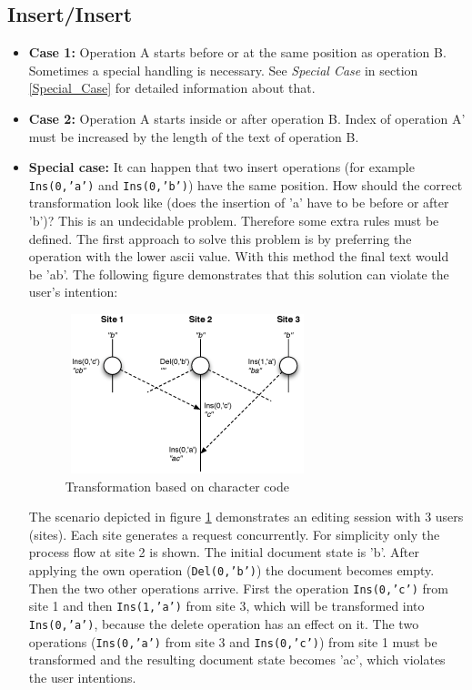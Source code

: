 \subsection{Insert/Insert}
\begin{itemize}
\item \textbf{Case 1:}
Operation A starts before or at the same position as operation B. Sometimes a special handling is necessary. See \emph{Special Case} in section \ref{Special_Case} for detailed information about that.
\item \textbf{Case 2:}
Operation A starts inside or after operation B. Index of operation A' must be increased by the length of the text of operation B.
\item \textbf{Special case:}
\label{Special_Case}
It can happen that two insert operations (for example \texttt{Ins(0,'a')} and \texttt{Ins(0,'b')}) have the same position. How should the correct transformation look like (does the insertion of 'a' have to be before or after 'b')? This is an undecidable problem. Therefore some extra rules must be defined. The first approach to solve this problem is by preferring the operation with the lower ascii value. With this method the final text would be 'ab'. The following figure demonstrates that this solution can violate the user's intention:
\begin{figure}[H]
\centering
\includegraphics[height=4.63cm,width=7.12cm]{../../images/algo-impl/transform_ins_ins_charpos.eps}
\caption{Transformation based on character code}
\label{Transformation based on character code}
\end{figure}
The scenario depicted in figure \ref{Transformation based on character code} demonstrates an editing session with 3 users (sites). Each site generates a request concurrently. For simplicity only the process flow at site 2 is shown. The initial document state is 'b'. After applying the own operation (\texttt{Del(0,'b')}) the document becomes empty. Then the two other operations arrive. First the operation \texttt{Ins(0,'c')} from site 1 and then \texttt{Ins(1,'a')} from site 3, which will be transformed into \texttt{Ins(0,'a')}, because the delete operation has an effect on it. The two operations (\texttt{Ins(0,'a')} from site 3 and \texttt{Ins(0,'c')}) from site 1 must be transformed and the resulting document state becomes 'ac', which violates the user intentions.


\end{itemize}
